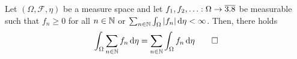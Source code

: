 \begin{corollary}\label{cor:integral-infinite-sum}
Let $(\Omega,\mathcal{F},\eta)$ be a measure space and let $f_1,f_2,\ldots : \Omega \to \overline{3.8}$ be measurable such that $f_n \geq 0$ for all $n \in \mathbb{N}$ or
\(
\sum_{n \in \mathbb{N}}\int_{\Omega}|f_n|\,\mathrm{d}\eta < \infty
\).
Then, there holds
\begin{equation}\label{eq:integral-infinite-sum}
\int_{\Omega}\sum_{n \in \mathbb{N}} f_n\,\mathrm{d}\eta
=
\sum_{n \in \mathbb{N}}\int_{\Omega} f_n\,\mathrm{d}\eta
\qedhere
\end{equation}
\end{corollary}
